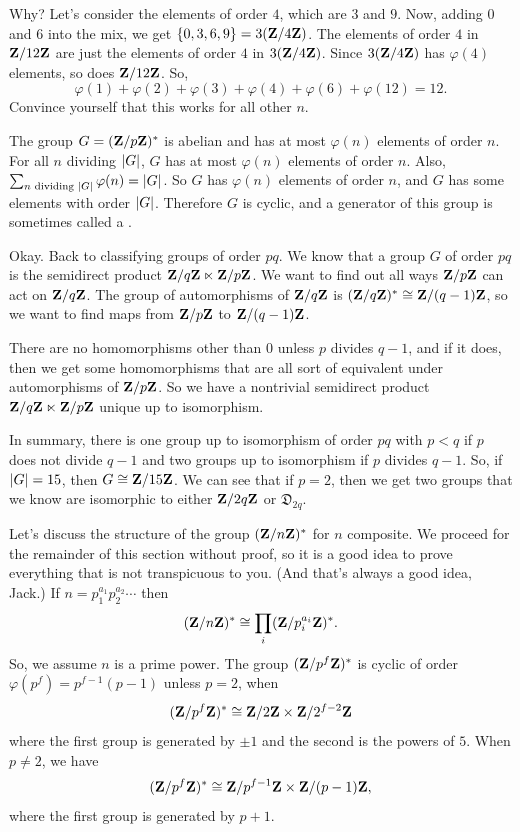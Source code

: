 \documentclass[11pt, twoside]{amsart}
\begin{document}
Why? Let's consider the elements of order $4$, which are $3$ and $9$. Now, adding $0$ and $6$ into the mix, we get $ \{0,3,6,9\} = 3(\mathbf{Z}/4\mathbf{Z} )$. The elements of order $4$ in $\mathbf{Z}/{12}\mathbf{Z}$ are just the elements of order $4$ in $3(\mathbf{Z}/4\mathbf{Z} )$. Since $3(\mathbf{Z}/4\mathbf{Z} )$ has $\varphi(4) $ elements, so does $\mathbf{Z}/12\mathbf{Z}$. So, 
$$
\varphi (1) + \varphi (2)  + \varphi (3) + \varphi (4) + \varphi (6) + \varphi (12) = 12.
$$
Convince yourself that this works for all other $n$.

The group $G = (\mathbf{Z}/p\mathbf{Z})^*$ is abelian and has at most $\varphi (n) $ elements of order $n$. For all $n$ dividing $\left \lvert G \right \rvert$, $G$ has at most $\varphi(n)$ elements of order $n$. Also, $\sum_{n \textrm{ dividing } \left \lvert G \right \rvert} \varphi(n) = \left \lvert G \right \rvert$. So $G$ has $\varphi(n)$ elements of order $n$, and $G$ has some elements with order $\left \lvert G \right \rvert$. Therefore $G$ is cyclic, and a generator of this group is sometimes called a .

Okay. Back to classifying groups of order $pq$. We know that a group $G$ of order $pq$ is the semidirect product $\mathbf{Z}/q\mathbf{Z} \ltimes \mathbf{Z}/p\mathbf{Z}$. We want to find out all ways $\mathbf{Z}/p\mathbf{Z}$ can act on $\mathbf{Z}/q\mathbf{Z}$. The group of automorphisms of $\mathbf{Z}/q\mathbf{Z}$ is $(\mathbf{Z}/q\mathbf{Z})^* \cong \mathbf{Z}/(q-1)\mathbf{Z}$, so we want to find maps from $\mathbf{Z}/p\mathbf{Z}$ to $\mathbf{Z}/(q-1)\mathbf{Z}$.

There are no homomorphisms other than $0$ unless $p$ divides $q-1$, and if it does, then we get some homomorphisms that are all sort of equivalent under automorphisms of $\mathbf{Z}/p\mathbf{Z}$. So we have a nontrivial semidirect product $\mathbf{Z}/q\mathbf{Z} \ltimes \mathbf{Z}/p\mathbf{Z}$ unique up to isomorphism. 

In summary, there is one group up to isomorphism of order $pq$ with $p<q$ if $p$ does not divide $q-1$ and two groups up to isomorphism if $p$ divides $q-1$. So, if $\left \lvert G \right \rvert = 15$, then $G \cong \mathbf{Z}/15\mathbf{Z}$. We can see that if $p=2$, then we get two groups that we know are isomorphic to either $\mathbf{Z}/2q\mathbf{Z}$ or $\mathfrak{D}_{2q}$.

Let's discuss the structure of the group $(\mathbf{Z}/n\mathbf{Z} )^*$ for $n$ composite. We proceed for the remainder of this section without proof, so it is a good idea to prove everything that is not transpicuous to you. (And that's always a good idea, Jack.) If $n = p_1^{a_1} p_2^{a_2}\cdots $ then 
$$
(\mathbf{Z}/n\mathbf{Z} )^* \cong \prod_i (\mathbf{Z}/p_i^{a_i}\mathbf{Z})^*.
$$
So, we assume $n$ is a prime power. The group $(\mathbf{Z}/ {p^f}\mathbf{Z})^*$ is cyclic of order $\varphi (p^f) = p^{f-1} (p-1)$ unless $p=2$, when 
$$
(\mathbf{Z}/ {p^f}\mathbf{Z})^* \cong \mathbf{Z}/2\mathbf{Z}  \times \mathbf{Z}/ {2^{f-2}}\mathbf{Z}
$$
where the first group is generated by $\pm 1$ and the second is the powers of $5$. When $p\ne 2$, we have 
$$
(\mathbf{Z}/ {p^f}\mathbf{Z})^* \cong \mathbf{Z}/ {p^{f-1}}\mathbf{Z} \times \mathbf{Z}/ {(p-1)}\mathbf{Z},
$$
where the first group is generated by $p+1$.
\end{document}
